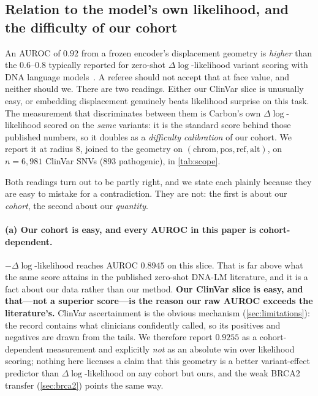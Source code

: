 \documentclass{article}
\begin{document}
\tabScope

\subsection{Relation to the model's own likelihood, and the difficulty of our cohort}
\label{sec:loglik}

An AUROC of $0.92$ from a frozen encoder's displacement geometry is \emph{higher} than the
$0.6$--$0.8$ typically reported for zero-shot $\Delta\log$-likelihood variant scoring with DNA
language models~\citep{gpn2023,evo2024,esm1v2021}. A referee should not accept that at face value,
and neither should we. There are two readings. Either our ClinVar slice is unusually easy, or
embedding displacement genuinely beats likelihood surprise on this task. The measurement that
discriminates between them is Carbon's own $\Delta\log$-likelihood scored on the \emph{same}
variants: it is the standard score behind those published numbers, so it doubles as a
\emph{difficulty calibration} of our cohort. We report it at radius $8$, joined to the geometry on
$(\text{chrom},\text{pos},\text{ref},\text{alt})$, on $n{=}6{,}981$ ClinVar SNVs ($893$ pathogenic),
in \cref{tab:scope}.

Both readings turn out to be partly right, and we state each plainly because they are easy to
mistake for a contradiction. They are not: the first is about our \emph{cohort}, the second about
our \emph{quantity}.

\paragraph{(a) Our cohort is easy, and every AUROC in this paper is cohort-dependent.}
$-\Delta\log$-likelihood reaches AUROC $0.8945$ on this slice. That is far above what the same score
attains in the published zero-shot DNA-LM literature, and it is a fact about our data rather than
our method. \textbf{Our ClinVar slice is easy, and that---not a superior score---is the reason our
raw AUROC exceeds the literature's.} ClinVar ascertainment is the obvious mechanism
(\cref{sec:limitations}): the record contains what clinicians confidently called, so its positives
and negatives are drawn from the tails. We therefore report $0.9255$ as a cohort-dependent
measurement and explicitly \emph{not} as an absolute win over likelihood scoring; nothing here
licenses a claim that this geometry is a better variant-effect predictor than
$\Delta\log$-likelihood on any cohort but ours, and the weak BRCA2 transfer (\cref{sec:brca2})
points the same way.
\end{document}
